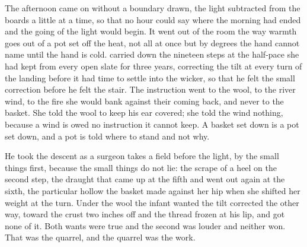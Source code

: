The afternoon came on without a boundary drawn, the light subtracted from the boards a little at a time, so that no hour could say where the morning had ended and the going of the light would begin. It went out of the room the way warmth goes out of a pot set off the heat, not all at once but by degrees the hand cannot name until the hand is cold.  carried  down the nineteen steps at the half-pace she had kept from every open slate for three years, correcting the tilt at every turn of the landing before it had time to settle into the wicker, so that he felt the small correction before he felt the stair. The instruction went to the wool, to the river wind, to the fire she would bank against their coming back, and never to the basket. She told the wool to keep his ear covered; she told the wind nothing, because a wind is owed no instruction it cannot keep. A basket set down is a pot set down, and a pot is told where to stand and not why.

He took the descent as a surgeon takes a field before the light, by the small things first, because the small things do not lie: the scrape of a heel on the second step, the draught that came up at the fifth and went out again at the sixth, the particular hollow the basket made against her hip when she shifted her weight at the turn. Under the wool the infant wanted the tilt corrected the other way, toward the crust two inches off and the thread frozen at his lip, and got none of it. Both wants were true and the second was louder and neither won. That was the quarrel, and the quarrel was the work.

